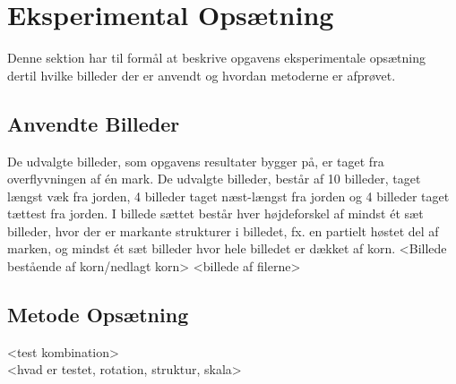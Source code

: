 \chapter{Eksperimental Opsætning}
Denne sektion har til formål at beskrive opgavens eksperimentale opsætning dertil hvilke billeder der er anvendt og hvordan metoderne er afprøvet.
\section{Anvendte Billeder}
De udvalgte billeder, som opgavens resultater bygger på, er taget fra overflyvningen af én mark. De udvalgte billeder, består af 10 billeder, taget længst væk fra jorden, 4 billeder taget næst-længst fra jorden og 4 billeder taget tættest fra jorden. I billede sættet består hver højdeforskel af mindst ét sæt billeder, hvor der er markante strukturer i billedet, fx. en partielt høstet del af marken, og mindst ét sæt billeder hvor hele billedet er dækket af korn.
<Billede bestående af korn/nedlagt korn>
<billede af filerne>
\section{Metode Opsætning}
<test kombination> \\
<hvad er testet, rotation, struktur, skala>